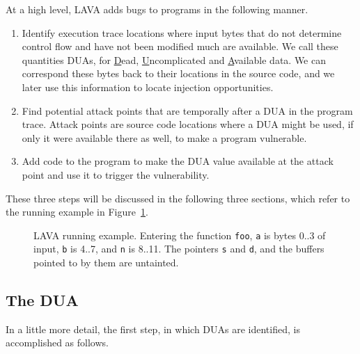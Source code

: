 
At a high level, LAVA adds bugs to programs in the following manner.

\begin {enumerate}
\item Identify execution trace locations where input bytes that do not determine control flow and have not been modified much are available. 
We call these quantities DUAs, for \underline{D}ead, \underline{U}ncomplicated and \underline{A}vailable data.
We can correspond these bytes back to their locations in the source code, and we later use this information to locate injection opportunities.
\item Find potential attack points that are temporally after a DUA in the program trace.
Attack points are source code locations where a DUA might be used, if only it were available there as well, to make a program vulnerable. 
\item Add code to the program to make the DUA value available at the attack point and use it to trigger the vulnerability. 
\end{enumerate}

These three steps will be discussed in the following three sections, which refer to the running example in Figure~\ref{fig:worked-example}.

\begin{figure}

\caption{LAVA running example.  
Entering the function \texttt{foo}, \texttt{a} is bytes 0..3 of input, \texttt{b} is 4..7, and \texttt{n} is 8..11.
The pointers \texttt{s} and \texttt{d}, and the buffers pointed to by them are untainted.}
\label{fig:worked-example}
\end{figure}

\subsection {The DUA}

In a little more detail, the first step, in which DUAs are identified, is accomplished as follows.  

